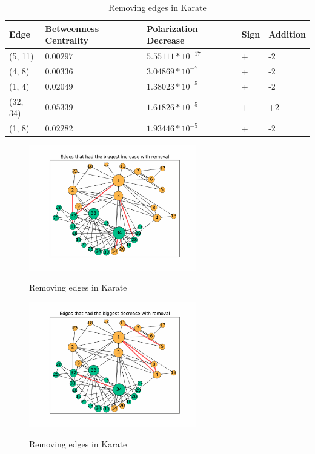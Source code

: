 \begin{table}[H]
\begin{table}[H]
 \caption{Edges with the biggest decrease of polarization }
 \label{tab:edgesLargest}
 \begin{tabular}{| l || l | l | l | l |}
 \hline
  Edge & Betweenness Centrality & Polarization Decrease & Sign & Addition\\
  \hline
  \hline
  (5, 11) & $0.00297$ & $5.55111*10^{-17}$ & + &  -2\\
  \hline
  (4, 8) & $0.00336$ & $3.04869*10^{-7}$ & + &  -2\\
  \hline
  (1, 4) & $0.02049$ & $1.38023*10^{-5}$ & + &  -2\\
  \hline
  (32, 34) & $0.05339$ & $1.61826*10^{-5}$ & + &  +2\\
  \hline
  (1, 8) & $0.02282$ & $1.93446*10^{-5}$ & + &  -2\\
  \hline
  \hline
 \end{tabular}
\end{table}

\begin{figure}[H]
	\centering
	\includegraphics[width=0.65\textwidth]{Figures/karate_increase}
	\label{fig:karate_increase}
	\caption{Removing edges in Karate}
\end{figure}

\begin{figure}[H]
	\centering
	\includegraphics[width=0.65\textwidth]{Figures/karate_decrease}
	\label{fig:karate_decrease}
	\caption{Removing edges in Karate}
\end{figure}



\end{table}
